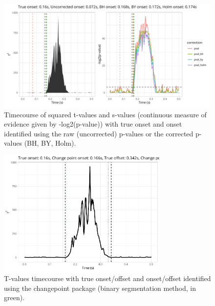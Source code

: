 \documentclass[
  doc,
  floatsintext,
  longtable,
  a4paper,
  nolmodern,
  notxfonts,
  notimes,
  colorlinks=true,linkcolor=blue,citecolor=blue,urlcolor=blue]{apa7}
\begin{document}
\begin{figure}[H]

\caption{Timecourse of squared t-values and s-values (continuous measure
of evidence given by -log2(p-value)) with true onset and onset
identified using the raw (uncorrected) p-values or the corrected
p-values (BH, BY, Holm).}

{\centering \includegraphics[width=1\textwidth,height=\textheight]{brms_meeg_files/figure-pdf/test-1d-1.pdf}

}

\end{figure}%

\begin{figure}[H]

\caption{T-values timecourse with true onset/offset and onset/offset
identified using the changepoint package (binary segmentation method, in
green).}

{\centering \includegraphics[width=0.75\textwidth,height=\textheight]{brms_meeg_files/figure-pdf/changepoint-1.pdf}

}

\end{figure}%
\end{document}
